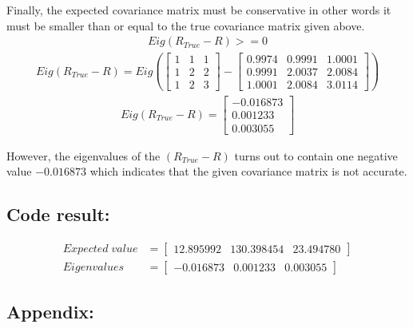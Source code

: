 \documentclass[a4paper]{article}
\begin{document}
Finally, the expected covariance matrix must be conservative in other words it must be smaller than or equal to the 
true covariance matrix given above.
\begin{align*}
\boxed{Eig(R_{True} - R) >= 0}
\end{align*}
\begin{align*}
Eig(R_{True} - R) = Eig\left(
	\begin{bmatrix}
		1 & 1 & 1 \\ 
		1 & 2 & 2 \\
		1 & 2 & 3
	\end{bmatrix}
	-
	\begin{bmatrix}
		0.9974  &  0.9991  &  1.0001 \\
    	0.9991  &  2.0037  &  2.0084 \\
    	1.0001  &  2.0084  &  3.0114
	\end{bmatrix}
\right)
\end{align*}
\begin{align*}
Eig(R_{True} - R) =
	\begin{bmatrix}
		-0.016873 \\
		0.001233 \\
		0.003055		
	\end{bmatrix}
\end{align*}

However, the eigenvalues of the $(R_{True} - R)$ turns out to contain one negative value $-0.016873$ 
which indicates that the given covariance matrix is not accurate.

\subsection*{Code result:}
\begin{align*}
	Expected \; value &= 
	\begin{bmatrix}
		12.895992 & 130.398454 & 23.494780
	\end{bmatrix} \\
	Eigenvalues &= 
	\begin{bmatrix}
		-0.016873 & 0.001233 & 0.003055
	\end{bmatrix}
\end{align*}

\newpage
\subsection*{Appendix:}

\end{document}
